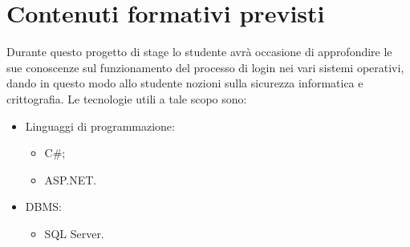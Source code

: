 \section*{Contenuti formativi previsti}
Durante questo progetto di stage lo studente avrà occasione di approfondire le sue conoscenze sul funzionamento del processo di login nei vari sistemi operativi, dando in questo modo allo studente nozioni sulla sicurezza informatica e crittografia.
\newline Le tecnologie utili a tale scopo sono:
\begin{itemize}
	\item Linguaggi di programmazione:
	\begin{itemize}
		\item C\#;
		\item ASP.NET.
	\end{itemize}
	\item DBMS:
	\begin{itemize}
		\item SQL Server.
	\end{itemize}
\end{itemize}
\newpage